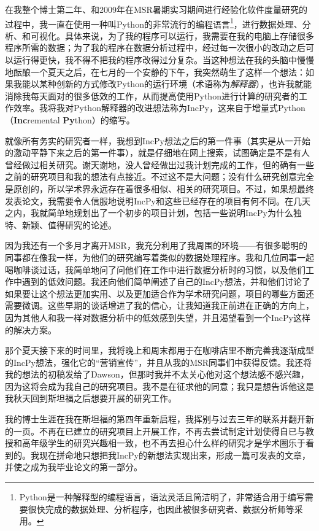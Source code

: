 \documentclass[letter,12pt]{book}
\begin{document}
\begin{CJK}{UTF8}{gbsn}
在我整个博士第二年、和2009年在MSR暑期实习期间进行经验化软件度量研究的过程中，我一直在使用一种叫Python的非常流行的编程语言\footnote{Python是一种解释型的编程语言，语法灵活且简洁明了，非常适合用于编写需要很快完成的数据处理、分析程序，也因此被很多研究者、数据分析师等采用。}，进行数据处理、分析、和可视化。具体来说，为了我的程序可以运行，我需要在我的电脑上存储很多程序所需的数据；为了我的程序在数据分析过程中，经过每一次很小的改动之后可以运行得更快，我不得不把我的程序改得过分复杂。当这种想法在我的头脑中慢慢地酝酿一个夏天之后，在七月的一个安静的下午，我突然萌生了这样一个想法：如果我能以某种创新的方式修改Python的运行环境（术语称为\emph{解释器}），也许我就能消除我每天面对的很多低效的工作，从而提高使用Python进行计算的研究者的工作效率。我将我对Python解释器的改进想法称为IncPy，这来自于增量式Python（\textbf{Inc}remental \textbf{Py}thon）的缩写。

\breakline

就像所有务实的研究者一样，我想到IncPy想法之后的第一件事（其实是从一开始的激动平静下来之后的第一件事），就是仔细地在网上搜索，试图确定是不是有人曾经做过相关研究。谢天谢地，没人曾经做出过我计划完成的工作，但的确有一些之前的研究项目和我的想法有点接近。不过这不是大问题；没有什么研究创意完全是原创的，所以学术界永远存在着很多相似、相关的研究项目。不过，如果想最终发表论文，我需要令人信服地说明IncPy和这些已经存在的项目有何不同。在几天之内，我就简单地规划出了一个初步的项目计划，包括一些说明IncPy为什么独特、新颖、值得研究的论述。

因为我还有一个多月才离开MSR，我充分利用了我周围的环境——有很多聪明的同事都在像我一样，为他们的研究编写着类似的数据处理程序。我和几位同事一起喝咖啡谈过话，我简单地问了问他们在工作中进行数据分析时的习惯，以及他们工作中遇到的低效问题。我还向他们简单阐述了自己的IncPy想法，并和他们讨论了如果要让这个想法更加实用、以及更加适合作为学术研究问题，项目的哪些方面还需要微调。这些早期的谈话增进了我的信心，让我知道我正前进在正确的方向上，因为其他人和我一样对数据分析中的低效感到失望，并且渴望看到一个IncPy这样的解决方案。

那个夏天接下来的时间里，我将晚上和周末都用于在咖啡店里不断完善我逐渐成型的IncPy想法，强化它的“营销宣传”，并且从我的MSR同事们中获得反馈。我还将我的想法的初稿发给了Dawson，但那时我并不太关心他对这个想法感不感兴趣，因为这将会成为我自己的研究项目。我不是在征求他的同意；我只是想告诉他这是我秋天回到斯坦福之后想要开展的研究工作。

\breakline

我的博士生涯在我在斯坦福的第四年重新启程，我挥别与过去三年的联系并翻开新的一页。不再在已建立的研究项目上开展工作，不再去尝试制定计划使得自已与教授和高年级学生的研究兴趣相一致，也不再去担心什么样的研究才是学术圈乐于看到的。我现在拼命地只想把我IncPy的新想法实现出来，形成一篇可发表的文章，并使之成为我毕业论文的第一部分。


\end{CJK}
\end{document}
